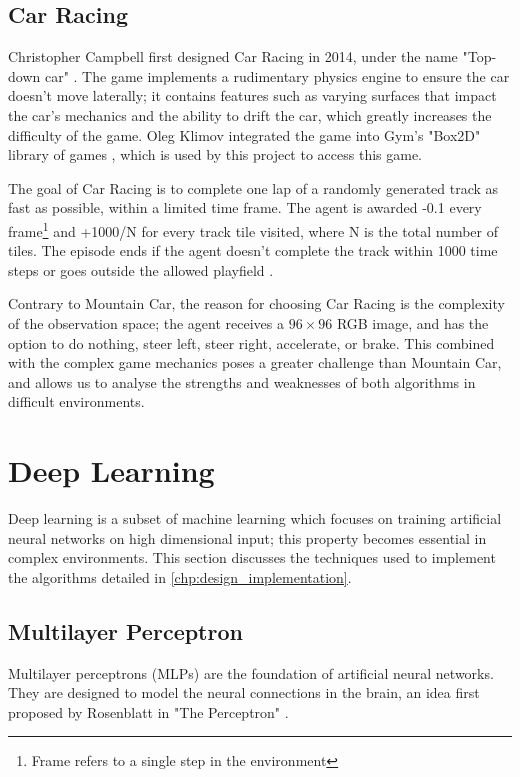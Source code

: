 \subsection{Car Racing} \label{sec:car_racing_background}
Christopher Campbell first designed Car Racing in 2014, under the name
"Top-down car" \cite{campbell2014car}. The game implements a rudimentary
physics engine to ensure the car doesn't move laterally; it contains features
such as varying surfaces that impact the car's mechanics and the ability to
drift the car, which greatly increases the difficulty of the game. Oleg Klimov
integrated the game into Gym's "Box2D" library of games \cite{brockman2016gym},
which is used by this project to access this game.

The goal of Car Racing is to complete one lap of a randomly generated track as
fast as possible, within a limited time frame. The agent is awarded -0.1 every
frame\footnote{Frame refers to a single step in the environment} and +1000/N
for every track tile visited, where N is the total number of tiles. The episode
ends if the agent doesn't complete the track within 1000 time steps or goes
outside the allowed playfield \cite{brockman2016gym}.

Contrary to Mountain Car, the reason for choosing Car Racing is the complexity
of the observation space; the agent receives a $96\times 96$ RGB image, and has
the option to do nothing, steer left, steer right, accelerate, or brake. This
combined with the complex game mechanics poses a greater challenge than
Mountain Car, and allows us to analyse the strengths and weaknesses of both
algorithms in difficult environments.

\section{Deep Learning}

Deep learning is a subset of machine learning which focuses on training
artificial neural networks on high dimensional input; this property becomes
essential in complex environments. This section discusses the techniques used
to implement the algorithms detailed in \autoref{chp:design_implementation}.

\subsection{Multilayer Perceptron}

Multilayer perceptrons (MLPs) are the foundation of artificial neural networks.
They are designed to model the neural connections in the brain, an idea first
proposed by Rosenblatt in "The Perceptron" \cite{rosenblatt1958perceptron}.

